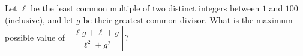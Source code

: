 Let $\ell$ be the least common multiple of two distinct integers between $1$ and $100$ (inclusive), and let $g$ be their greatest common divisor. What is the maximum possible value of $\left\lfloor\dfrac{\ell g+\ell+g}{\ell^2+g^2}\right\rfloor$?
